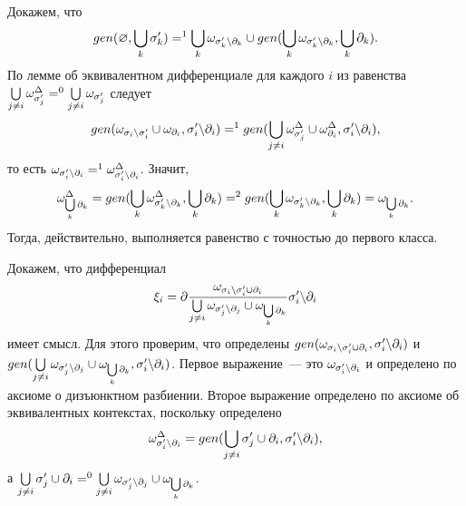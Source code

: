 Докажем, что $$gen(\varnothing, \bigcup\limits_k {\sigma^\prime_k}) =^1 \bigcup\limits_k \omega_{{\sigma^\prime_k}{\setminus}{\partial_k}} \cup gen(\bigcup\limits_k \omega_{{\sigma^\prime_k}{\setminus}{\partial_k}}, \bigcup\limits_k {\partial_k}).$$ 
По лемме об эквивалентном дифференциале для каждого $i$ из равенства $\bigcup\limits_{j \neq i}\omega^\Delta_{{\sigma^\prime_j}} =^0 \bigcup\limits_{j \neq i} \omega_{{\sigma^\prime_j}}$ следует $$gen(\omega_{{\sigma_i}{\setminus}{\sigma^\prime_i}} \cup \omega_{\partial_i}, {\sigma^\prime_i}{\setminus}{\partial_i}) =^1 gen(\bigcup\limits_{j \neq i}\omega^\Delta_{{\sigma^\prime_j}} \cup \omega^\Delta_{\partial_i}, {\sigma^\prime_i}{\setminus}{\partial_i}),$$ 
то есть $\omega_{{\sigma^\prime_i}{\setminus}{\partial_i}} =^1 \omega^\Delta_{{\sigma^\prime_i}{\setminus}{\partial_i}}$. Значит, $$\omega^\Delta_{\bigcup\limits_k {\partial_k}} = gen(\bigcup\limits_k \omega^\Delta_{{\sigma^\prime_k}{\setminus}{\partial_k}}, \bigcup\limits_k {\partial_k}) =^2 gen(\bigcup\limits_k \omega_{{\sigma^\prime_k}{\setminus}{\partial_k}}, \bigcup\limits_k {\partial_k}) = \omega_{\bigcup\limits_k {\partial_k}}.$$ 
Тогда, действительно, выполняется равенство с точностью до первого класса.

Докажем, что дифференциал $$\xi_i = \partial\dfrac{\omega_{{\sigma_i}{\setminus}{\sigma^\prime_i} \cup {\partial_i}}}{\bigcup\limits_{j \neq i} \omega_{{\sigma^\prime_j}{\setminus}{\partial_j}} \cup \omega_{\bigcup\limits_k \partial_k}} {\sigma^\prime_i}{\setminus}{\partial_i}$$ имеет смысл. Для этого проверим, что определены $gen(\omega_{{\sigma_i}{\setminus}{\sigma^\prime_i} \cup {\partial_i}}, {\sigma^\prime_i}{\setminus}{\partial_i})$ и $gen(\bigcup\limits_{j \neq i} \omega_{{\sigma^\prime_j}{\setminus}{\partial_j}} \cup \omega_{\bigcup\limits_k \partial_k}, {\sigma^\prime_i}{\setminus}{\partial_i})$. Первое выражение~--- это $\omega_{{\sigma^\prime_i}{\setminus}{\partial_i}}$ и определено по аксиоме о дизъюнктном разбиении. Второе выражение определено по аксиоме об эквивалентных контекстах, поскольку определено $$\omega^\Delta_{{\sigma^\prime_i}{\setminus}{\partial_i}} = gen(\bigcup\limits_{j \neq i} {\sigma^\prime_j} \cup {\partial_i}, {\sigma^\prime_i}{\setminus}{\partial_i}),$$ 
а $\bigcup\limits_{j \neq i} {\sigma^\prime_j} \cup {\partial_i} =^0 \bigcup\limits_{j \neq i} \omega_{{\sigma^\prime_j}{\setminus}{\partial_j}} \cup \omega_{\bigcup\limits_k \partial_k}$.

